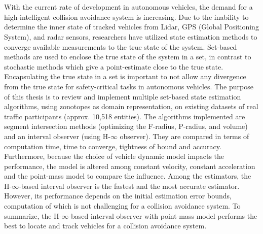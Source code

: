 \chapter{\abstractname}
With the current rate of development in autonomous vehicles, the demand for a high-intelligent collision avoidance system is increasing. Due to the inability to determine the inner state of tracked vehicles from Lidar, GPS (Global Positioning System), and radar sensors, researchers have utilized state estimation methods to converge available measurements to the true state of the system. Set-based methods are used to enclose the true state of the system in a set, in contrast to stochastic methods which give a point-estimate close to the true state. Encapsulating the true state in a set is important to not allow any divergence from the true state for safety-critical tasks in autonomous vehicles. The purpose of this thesis is to review and implement multiple set-based state estimation algorithms, using zonotopes as domain representation, on existing datasets of real traffic participants (approx. 10,518 entities). The algorithms implemented are segment intersection methods (optimizing the F-radius, P-radius, and volume) and an interval observer (using H-$\infty$ observer). They are compared in terms of computation time, time to converge, tightness of bound and accuracy. Furthermore, because the choice of vehicle dynamic model impacts the performance, the model is altered among constant velocity, constant acceleration and the point-mass model to compare the influence. Among the estimators, the H-$\infty$-based interval observer is the fastest and the most accurate estimator. However, its performance depends on the initial estimation error bounds, computation of which is not challenging for a collision avoidance system. To summarize, the H-$\infty$-based interval observer with point-mass model performs the best to locate and track vehicles for a collision avoidance system.
